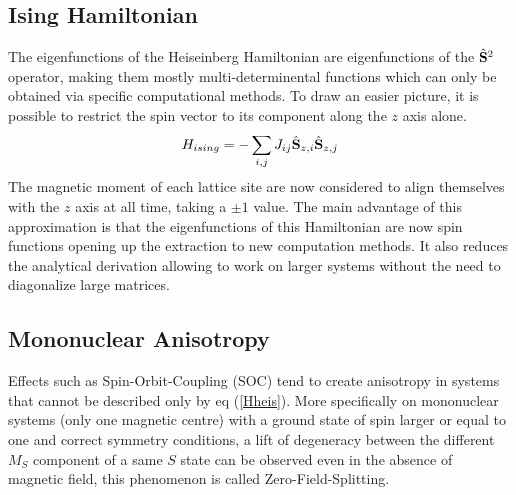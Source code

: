\documentclass[10pt]{report}
\numberwithin{equation}{section}
\begin{document}
\subsection*{Ising Hamiltonian}

The eigenfunctions of the Heiseinberg Hamiltonian are eigenfunctions of the $\hat{\vb S}^2$ operator, making them mostly multi-determinental functions which can only be obtained via specific computational methods.
To draw an easier picture, it is possible to restrict the spin vector to its component along the $z$ axis alone.
\begin{equation}
    H_{ising}=- \sum_{i,j} J_{ij} \hat{\vb S}_{z,i} \hat{\vb S}_{z,j}
\end{equation}
The magnetic moment of each lattice site are now considered to align themselves with the $z$ axis at all time, taking a $\pm 1$ value.
The main advantage of this approximation is that the eigenfunctions of this Hamiltonian are now spin functions opening up the extraction to new computation methods. 
It also reduces the analytical derivation allowing to work on larger systems without the need to diagonalize large matrices.

\subsection{Mononuclear Anisotropy}

\par Effects such as Spin-Orbit-Coupling (SOC) tend to create anisotropy in systems that cannot be described only by eq (\ref{Hheis}). 
More specifically on mononuclear systems (only one magnetic centre) with a ground state of spin larger or equal to one and correct symmetry conditions, a lift of degeneracy between the different $M_S$ component of a same $S$ state can be observed even in the absence of magnetic field, this phenomenon is called Zero-Field-Splitting.
\end{document}
